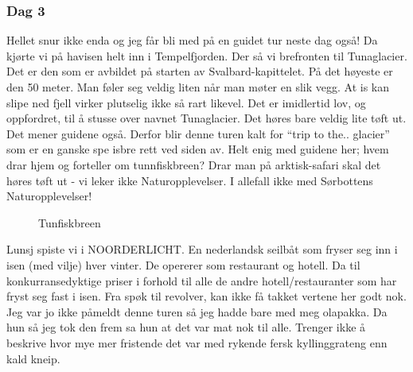 \subsubsection{Dag 3}
Hellet snur ikke enda og jeg får bli med på en guidet tur neste dag
også! Da kjørte vi på havisen helt inn i Tempelfjorden. Der så vi
brefronten til Tunaglacier. Det er den som er avbildet på starten av
Svalbard-kapittelet. På det høyeste er den 50 meter. Man føler seg
veldig liten når man møter en slik vegg. At is kan slipe ned fjell
virker plutselig ikke så rart likevel. Det er imidlertid lov, og
oppfordret, til å
stusse over navnet Tunaglacier. Det høres bare veldig lite tøft ut. Det
mener guidene også. Derfor blir denne turen kalt for ``trip to the..
glacier'' som er en ganske spe isbre rett ved siden av. Helt enig med
guidene her; hvem drar hjem og forteller om tunnfiskbreen?  Drar man på
arktisk-safari skal det høres tøft ut - vi leker ikke
Naturopplevelser. I allefall ikke med Sørbottens Naturopplevelser! \\

\begin{figure}[H]
	\centering
	\noindent{}
	\caption{Tunfiskbreen}
	\label{fig:tunfisk}
\end{figure}

Lunsj spiste vi i NOORDERLICHT. En nederlandsk seilbåt som fryser
seg inn i isen (med vilje) hver vinter. De opererer som restaurant og
hotell. Da til konkurransedyktige priser i forhold til alle de
andre hotell/restauranter som har fryst seg fast i isen. Fra spøk til
revolver, kan ikke få takket vertene her godt nok. Jeg var jo ikke
påmeldt denne turen så jeg hadde bare med meg olapakka. Da hun så jeg
tok den frem sa hun at det var mat nok til alle. Trenger ikke å
beskrive hvor mye mer fristende det var med rykende fersk
kyllinggrateng enn kald kneip.\\

